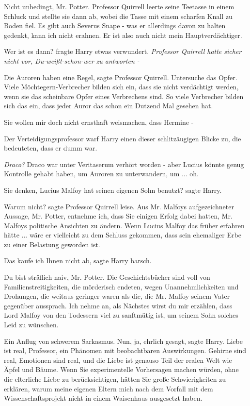 \glqq{}Nicht unbedingt, Mr. Potter.\grqq{} Professor Quirrell leerte seine
Teetasse in einem Schluck und stellte sie dann ab, wobei die Tasse mit einem
scharfen Knall zu Boden fiel. \glqq{}Es gibt auch Severus Snape - was er
allerdings davon zu halten gedenkt, kann ich nicht erahnen. Er ist also auch
nicht mein Hauptverdächtiger.\grqq{}

\glqq{}Wer ist es dann?\grqq{} fragte Harry etwas verwundert. \emph{Professor
Quirrell hatte sicher nicht vor, \glqq{}Du-weißt-schon-wer\grqq{} zu antworten -
}

\glqq{}Die Auroren haben eine Regel\grqq{}, sagte Professor Quirrell. \glqq{}
Untersuche das Opfer. Viele Möchtegern-Verbrecher bilden sich ein, dass sie
nicht verdächtigt werden, wenn sie das scheinbare Opfer eines Verbrechens sind.
So viele Verbrecher bilden sich das ein, dass jeder Auror das schon ein Dutzend
Mal gesehen hat.\grqq{}

\glqq{}Sie wollen mir doch nicht ernsthaft weismachen, dass Hermine -\grqq{}

Der Verteidigungsprofessor warf Harry einen dieser schlitzäugigen Blicke zu, die
bedeuteten, dass er dumm war.

\emph{Draco?} Draco war unter Veritaserum verhört worden - aber Lucius könnte
genug Kontrolle gehabt haben, um Auroren zu unterwandern, um ... oh.

\glqq{}Sie denken, Lucius Malfoy hat seinen eigenen Sohn benutzt?\grqq{} sagte
Harry.

\glqq{}Warum nicht?\grqq{} sagte Professor Quirrell leise. \glqq{}Aus Mr. Malfoys
aufgezeichneter Aussage, Mr. Potter, entnehme ich, dass Sie einigen Erfolg dabei
hatten, Mr. Malfoys politische Ansichten zu ändern. Wenn Lucius Malfoy das
früher erfahren hätte ... wäre er vielleicht zu dem Schluss gekommen, dass sein
ehemaliger Erbe zu einer Belastung geworden ist.\grqq{}

\glqq{}Das kaufe ich Ihnen nicht ab\grqq{}, sagte Harry barsch.

\glqq{}Du bist sträflich naiv, Mr. Potter. Die Geschichtsbücher sind voll von
Familienstreitigkeiten, die mörderisch endeten, wegen Unannehmlichkeiten und
Drohungen, die weitaus geringer waren als die, die Mr. Malfoy seinem Vater
gegenüber aussprach. Ich nehme an, als Nächstes wirst du mir erzählen, dass Lord
Malfoy von den Todessern viel zu sanftmütig ist, um seinem Sohn solches Leid zu
wünschen.\grqq{}

Ein Anflug von schwerem Sarkasmus. \glqq{}Nun, ja, ehrlich gesagt\grqq{}, sagte
Harry. \glqq{}Liebe ist real, Professor, ein Phänomen mit beobachtbaren
Auswirkungen. Gehirne sind real, Emotionen sind real, und die Liebe ist genauso
Teil der realen Welt wie Äpfel und Bäume. Wenn Sie experimentelle Vorhersagen
machen würden, ohne die elterliche Liebe zu berücksichtigen, hätten Sie große
Schwierigkeiten zu erklären, warum meine eigenen Eltern mich nach dem Vorfall
mit dem Wissenschaftsprojekt nicht in einem Waisenhaus ausgesetzt haben.\grqq{}


